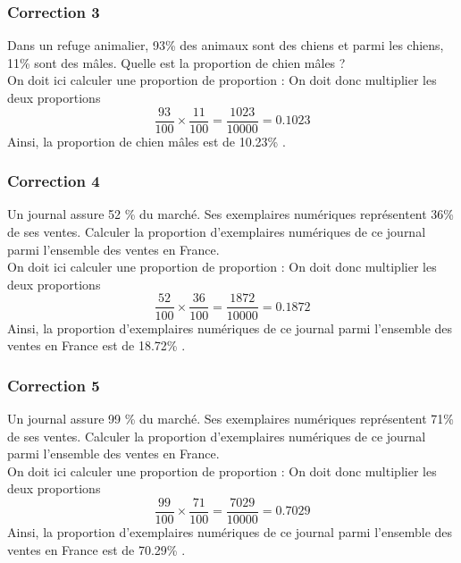 \documentclass[15pt, mathserif]{beamer}
\begin{document}
\begin{frame}
\vspace{-10mm}
	\frametitle{Correction 3}
Dans un refuge animalier, 93\% des animaux sont des chiens et parmi les chiens, 11\% sont des mâles.  Quelle est la proportion de chien mâles ? \\ On doit ici calculer une proportion de proportion : On doit donc multiplier les deux proportions $$ \dfrac{93}{100} \times \dfrac{11}{100} = \dfrac{1023}{10000} = 0.1023$$ Ainsi, la proportion de chien mâles est de 10.23\% .\end{frame}


\begin{frame}
\vspace{-10mm}
	\frametitle{Correction 4}
Un journal assure 52 \% du marché. Ses exemplaires numériques représentent 36\% de ses ventes. Calculer la proportion d'exemplaires numériques de ce journal parmi l'ensemble des ventes en France.\\ On doit ici calculer une proportion de proportion : On doit donc multiplier les deux proportions $$ \dfrac{52}{100} \times \dfrac{36}{100} = \dfrac{1872}{10000} = 0.1872$$ Ainsi, la proportion d’exemplaires numériques de ce journal parmi l’ensemble des ventes en France est de 18.72\% .\end{frame}


\begin{frame}
\vspace{-10mm}
	\frametitle{Correction 5}
Un journal assure 99 \% du marché. Ses exemplaires numériques représentent 71\% de ses ventes. Calculer la proportion d'exemplaires numériques de ce journal parmi l'ensemble des ventes en France.\\ On doit ici calculer une proportion de proportion : On doit donc multiplier les deux proportions $$ \dfrac{99}{100} \times \dfrac{71}{100} = \dfrac{7029}{10000} = 0.7029$$ Ainsi, la proportion d’exemplaires numériques de ce journal parmi l’ensemble des ventes en France est de 70.29\% .\end{frame}
\end{document}

